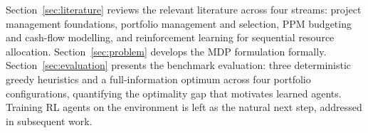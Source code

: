 Section~\ref{sec:literature} reviews the relevant literature across
four streams: project management foundations, portfolio management
and selection, PPM budgeting and cash-flow modelling, and
reinforcement learning for sequential resource allocation.
Section~\ref{sec:problem} develops the MDP formulation formally.
Section~\ref{sec:evaluation} presents the benchmark evaluation:
three deterministic greedy heuristics and a full-information optimum
across four portfolio configurations, quantifying the optimality gap
that motivates learned agents. Training RL agents on the environment
is left as the natural next step, addressed in subsequent work.
